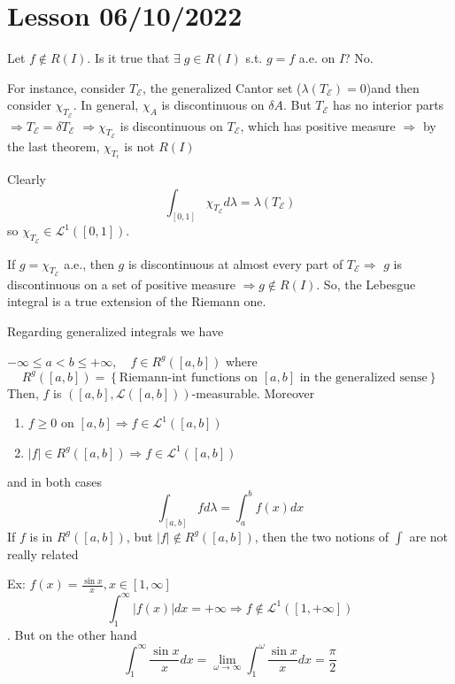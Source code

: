 \section{Lesson 06/10/2022}
Let \(f \not \in R(I)\). Is it true that \(\exists \; g \in R(I)\) s.t. \(g = f\) a.e. on \(I\)? No.

For instance, consider \(T_{\mathcal{E}}\), the generalized Cantor set (\(\lambda(T_{\mathcal{E}}) = 0\))and then consider \(\chi_{T_{\mathcal{E}}}\). 
In general, \(\chi_{A}\) is discontinuous on \(\delta A\).  But \(T_{\mathcal{E}}\) has no interior parts \(\Longrightarrow T_{\mathcal{E}} = \delta T_{\mathcal{E}}\) \(\Longrightarrow \chi_{T_{\mathcal{E}}}\) is discontinuous on \(T_{\mathcal{E}}\), which has positive measure
\(\Rightarrow \) by the last theorem, \(\chi_{T_\epsilon}\) is not \(R(I)\)

Clearly 
\[
    \int_{[0,1]} \chi_{T_{\mathcal{E}}} d\lambda = \lambda(T_{\mathcal{E}})
\]
so \(\chi_{T_{\mathcal{E}}} \in \mathcal{L}^1([0,1])\).  

If \(g = \chi_{T_{\mathcal{E}}}\) a.e., then \(g\) is discontinuous at almost every part of \(T_{\mathcal{E}} \Longrightarrow\) \(g\) is discontinuous on a set of positive measure \(\Longrightarrow g \not \in R(I)\). 
So, the Lebesgue integral is a true extension of the Riemann one.

Regarding generalized integrals we have

\begin{theorem}
    \(-\infty \leq a < b \leq +\infty, \quad f \in R^g([a,b])\) where 
    \[
        R^g([a,b]) = \left\lbrace \mbox{Riemann-int functions on }[a,b]\mbox{ in the generalized sense} \right\rbrace
    \]
    Then, \(f\) is \(([a,b], \mathcal{L}([a,b]))\)-measurable. Moreover
    \begin{enumerate}
        \item \(f \geq 0\) on \([a,b] \Longrightarrow f \in \mathcal{L}^1([a,b])\)
        \item \(\vert f \vert \in R^g([a,b]) \Longrightarrow f \in \mathcal{L}^1 ([a,b])\)
    \end{enumerate}
    and in both cases
    \[
        \int_{[a,b]} fd\lambda = \int_a^b f(x)dx
    \]
    If \(f\) is in \(R^g([a,b])\), but \(\vert f\vert \not \in R^g([a,b])\), then the two notions of \(\int\) are not really related
\end{theorem}

Ex:
\(f(x) = \frac{\sin x}{x},  x \in [1, \infty]\)
\[\int_1^{\infty} \vert f(x) \vert dx = +\infty \Longrightarrow f \not \in \mathcal{L}^1([1, +\infty])\].
But on the other hand
\[
    \int_1^{\infty} \frac{\sin x}{x} dx = \lim_{\omega \to \infty} \int_1^{\omega} \frac{\sin x}{x} dx = \frac{\pi}{2}
\]

